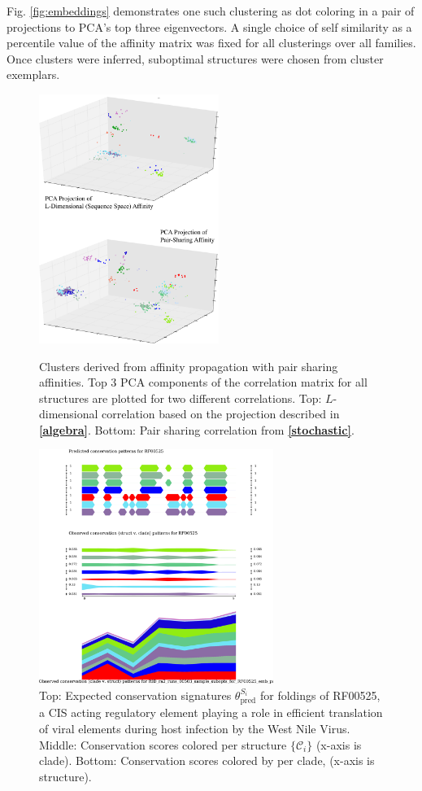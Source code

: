 \documentclass[12pt,a4paper]{article}
\begin{document}
Fig. \ref{fig:embeddings} demonstrates one such clustering as dot coloring in a pair of projections to PCA's top three eigenvectors. A single choice of self similarity as a percentile value of the affinity matrix was fixed for all clusterings over all families. Once clusters were inferred, suboptimal structures were chosen from cluster exemplars.


\begin{figure}[top]
  \begin{minipage}[b]{0.45\linewidth}
    \centering
    \includegraphics[width=2.3in]{figs/embeddings}
    \caption{Clusters derived from affinity propagation with pair sharing affinities. Top 3 PCA components of the correlation matrix for all structures are plotted for two different correlations. Top: $L$-dimensional correlation based on the projection described in \textbf{\ref{algebra}}. Bottom: Pair sharing correlation from \textbf{\ref{stochastic}}.}
    \label{fig:embeddings}
  \end{minipage}
  \hspace{0.5cm}
  \begin{minipage}[b]{0.45\linewidth}
    \includegraphics[width=3in]{figs/conservation}
    \centering
    \caption{Top: Expected conservation signatures $\theta^{S_i}_{\text{pred}}$ for foldings of RF00525, a CIS acting regulatory element playing a role in efficient translation of viral elements during host infection by the West Nile Virus. Middle: Conservation scores colored per structure $\{\mathcal{C}_i\}$ (x-axis is clade). Bottom: Conservation scores colored by per clade, (x-axis is structure).}
    \label{fig:conservation}
  \end{minipage}
  \centering

\end{figure}
\end{document}
